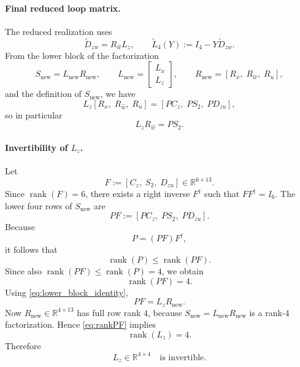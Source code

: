 \documentclass[11pt]{article}
\newcommand{\R}{\mathbb{R}}
\newcommand{\rank}{\operatorname{rank}}
\begin{document}
\paragraph{Final reduced loop matrix.}
The reduced realization uses
\begin{equation}
    \tilde D_{zw} = R_{\hat w}L_z,
    \qquad
    \tilde L_4(Y) := I_4 - Y\tilde D_{zw}.
    \label{eq:L4tilde_def}
\end{equation}
From the lower block of the factorization
\[
S_{\mathrm{new}} = L_{\mathrm{new}}R_{\mathrm{new}},
\qquad
L_{\mathrm{new}}=
\begin{bmatrix}
L_x\\
L_z
\end{bmatrix},
\qquad
R_{\mathrm{new}}=[R_x,\;R_{\hat w},\;R_u],
\]
and the definition of $S_{\mathrm{new}}$, we have
\begin{equation}
    L_z[R_x,\;R_{\hat w},\;R_u]
    =
    [PC_z,\;PS_2,\;PD_{zu}],
    \label{eq:lower_block_identity}
\end{equation}
so in particular
\begin{equation}
    L_zR_{\hat w}=PS_2.
    \label{eq:LzRhatw_identity}
\end{equation}

\paragraph{Invertibility of $L_z$.}
Let
\[
F := [C_z,\;S_2,\;D_{zu}] \in \R^{6\times 13}.
\]
Since $\rank(F)=6$, there exists a right inverse $F^\dagger$ such that
$FF^\dagger=I_6$. The lower four rows of $S_{\mathrm{new}}$ are
\[
PF := [PC_z,\;PS_2,\;PD_{zu}].
\]
Because
\[
P=(PF)F^\dagger,
\]
it follows that
\[
\rank(P)\le \rank(PF).
\]
Since also $\rank(PF)\le \rank(P)=4$, we obtain
\begin{equation}
    \rank(PF)=4.
    \label{eq:rankPF}
\end{equation}
Using \eqref{eq:lower_block_identity},
\[
PF=L_zR_{\mathrm{new}}.
\]
Now $R_{\mathrm{new}}\in\R^{4\times 13}$ has full row rank $4$, because
$S_{\mathrm{new}}=L_{\mathrm{new}}R_{\mathrm{new}}$ is a rank-$4$ factorization.
Hence \eqref{eq:rankPF} implies
\[
\rank(L_z)=4.
\]
Therefore
\begin{equation}
    L_z \in \R^{4\times 4}
    \quad \text{is invertible.}
    \label{eq:Lz_invertible}
\end{equation}
\end{document}
